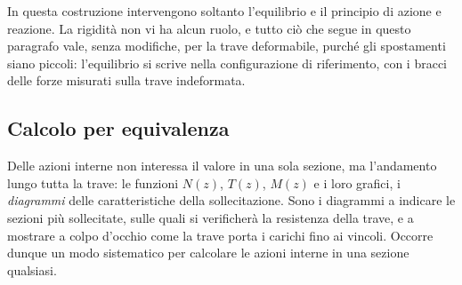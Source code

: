

In questa costruzione intervengono soltanto l'equilibrio
e il principio di azione e reazione. La rigidità non vi
ha alcun ruolo, e tutto ciò che segue in questo paragrafo
vale, senza modifiche, per la trave deformabile, purché
gli spostamenti siano piccoli: l'equilibrio si scrive
nella configurazione di riferimento, con i bracci delle
forze misurati sulla trave indeformata.



\subsection{Calcolo per equivalenza}
\label{sec:caratteristiche_calcolo}

Delle azioni interne non interessa il valore in una sola
sezione, ma l'andamento lungo tutta la trave: le funzioni
$N(z)$, $T(z)$, $M(z)$ e i loro grafici, i
\emph{diagrammi} delle caratteristiche
della sollecitazione. Sono i diagrammi a indicare le
sezioni più sollecitate, sulle quali si verificherà la
resistenza della trave, e a mostrare a colpo d'occhio
come la trave porta i carichi fino ai vincoli. Occorre
dunque un modo sistematico per calcolare le azioni
interne in una sezione qualsiasi.

